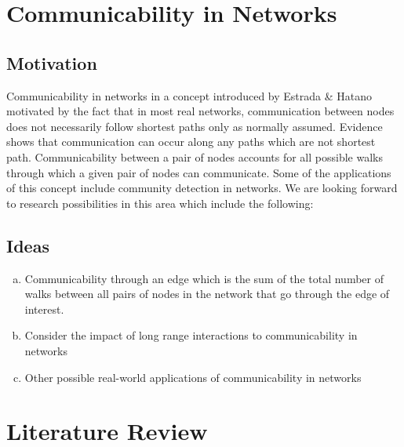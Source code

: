 \documentclass[10pt,a4paper]{article}
\begin{document}
	\section{Communicability in Networks}
	\subsection{Motivation}
	Communicability in networks in a concept introduced by Estrada \& Hatano \citep{estrada2008communicability} motivated by the fact that in most real networks, communication between nodes does not necessarily follow shortest paths only as normally assumed. Evidence shows that communication can occur along any paths which are not shortest path. Communicability between a pair of nodes accounts for all possible walks through which a given pair of nodes can communicate. Some of the applications of this concept include community detection in networks. We are looking forward to research possibilities in this area which include the following: 
	\subsection{Ideas}
	\begin{enumerate}[a)]
		\item Communicability through an edge which is the sum of the total number of walks between all pairs of nodes in the network that go through the edge of interest.
		\item Consider the impact of long range interactions to communicability in networks
		\item Other possible real-world applications of communicability in networks
	\end{enumerate}
	
	
	
	\newpage
	\section{Literature Review}
\end{document}
